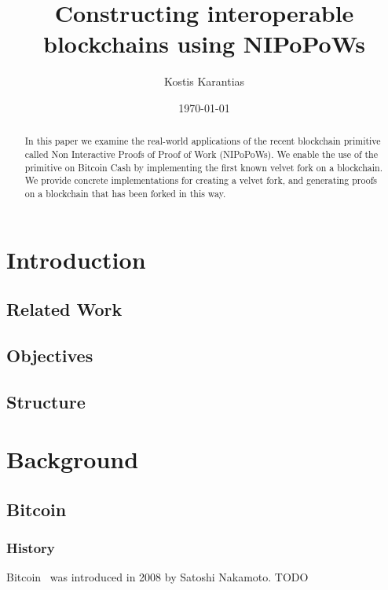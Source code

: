 \documentclass[11pt]{llncs}
\begin{document}
\title{Constructing interoperable blockchains using NIPoPoWs}
\date{\today}
\author{Kostis Karantias\\
    }
\maketitle
\noindent
\makebox[\linewidth]{\small \today}

\newpage

\begin{abstract}
  In this paper we examine the real-world applications of the recent blockchain
  primitive called Non Interactive Proofs of Proof of Work (NIPoPoWs). We
  enable the use of the primitive on Bitcoin Cash by implementing the first
  known velvet fork on a blockchain. We provide concrete implementations for
  creating a velvet fork, and generating proofs on a blockchain that has been
  forked in this way.
\end{abstract}

\newpage

\tableofcontents

\newpage

\thispagestyle{plain}

\section{Introduction}

\subsection{Related Work}
\subsection{Objectives}
\subsection{Structure}

\section{Background}

\subsection{Bitcoin}

\subsubsection{History}
Bitcoin~\cite{bitcoin} was introduced in 2008 by Satoshi Nakamoto. TODO
\end{document}
